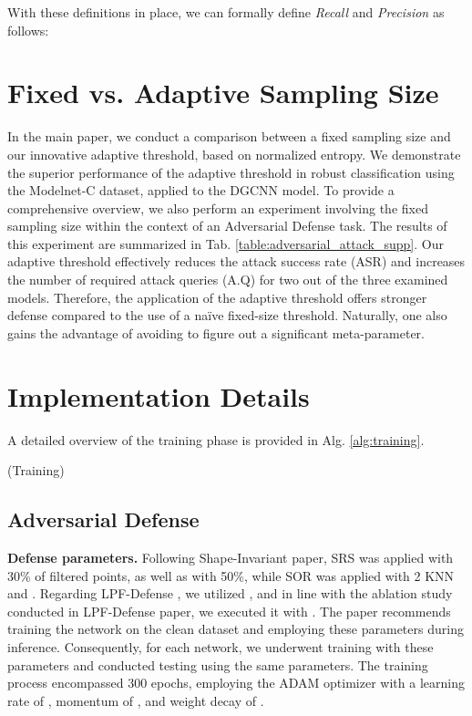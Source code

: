 \documentclass[10pt,twocolumn,letterpaper]{article}
\begin{document}
With these definitions in place, we can formally define \textit{Recall} and \textit{Precision} as follows:





\label{sec:recall_precision}

\section{Fixed vs. Adaptive Sampling Size}
\label{sec:fixed_vs_entropy}
In the main paper, we conduct a comparison between a fixed sampling size and our innovative adaptive threshold, based on normalized entropy. We demonstrate the superior performance of the adaptive threshold in robust classification using the Modelnet-C \cite{modelnet_c} dataset, applied to the DGCNN\cite{dgcnn} model. To provide a comprehensive overview, we also perform an experiment involving the fixed sampling size within the context of an Adversarial Defense task. The results of this experiment are summarized in Tab. \ref{table:adversarial_attack_supp}. Our adaptive threshold effectively reduces the attack success rate (ASR) and increases the number of required attack queries (A.Q) for two out of the three examined models. Therefore, the application of the adaptive threshold offers stronger defense compared to the use of a na\"ive fixed-size threshold. Naturally, one also gains the advantage of avoiding to figure out a significant meta-parameter.

\section{Implementation Details}
A detailed overview of the training phase is provided in Alg. \ref{alg:training}.
\begin{algorithm}
\caption{ (Training)}\label{alg:training}
\begin{algorithmic}
\Require{} 
\For {}
\State  
\State  {}
\State 
\State 
\State   
\State 
\State  
\State  
\State  
\EndFor
\State 
\end{algorithmic}
\end{algorithm}

\subsection{Adversarial Defense}
\textbf{Defense parameters.} Following Shape-Invariant \cite{shape_invariant} paper, SRS\cite{dupnet} was applied with 30\% of filtered points, as well as with 50\%, while SOR\cite{sor} was applied with 2 KNN and .
Regarding LPF-Defense \cite{lpf_defense}, we utilized , and in line with the ablation study conducted in LPF-Defense paper, we executed it with . The paper recommends training the network on the clean dataset and employing these parameters during inference. Consequently, for each network, we underwent training with these parameters and conducted testing using the same parameters. The training process encompassed 300 epochs, employing the ADAM optimizer with a learning rate of , momentum of , and weight decay of .
\end{document}
